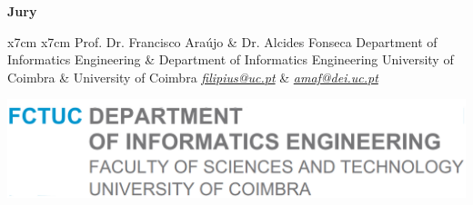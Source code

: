 \begin{center}
 	\vspace{-0.25cm}
 	\Large{\textbf{Jury}}\\[1pc]
 	\begin{table}[h]
 		\begin{center}
 			\setlength{\tabcolsep}{10pt}
 			\begin{tabular}{x{7cm} x{7cm}}
 				\large Prof. Dr. Francisco Araújo & \large Dr. Alcides Fonseca\tabularnewline
 				Department of Informatics Engineering & Department of Informatics Engineering \tabularnewline
 				University of Coimbra & University of Coimbra \tabularnewline
 				\href{mailto:filipius@uc.pt}{\textit{filipius@uc.pt}} & \href{mailto:amaf@dei.uc.pt}{\textit{amaf@dei.uc.pt}}
 			\end{tabular}
 		\end{center}
 	\end{table}
 	
 \end{center}
 
 \vfill
 \noindent\includegraphics[scale=0.25]{Figures/dei}
 
